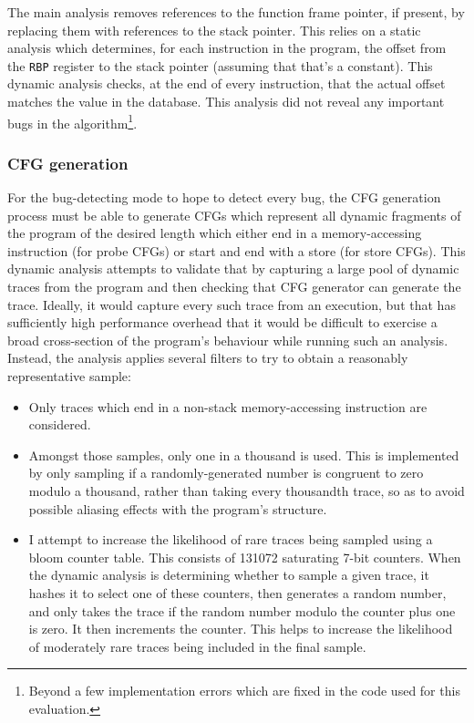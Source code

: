 The main analysis removes references to the function frame pointer, if
present, by replacing them with references to the stack pointer.  This
relies on a static analysis which determines, for each instruction in
the program, the offset from the \verb|RBP| register to the stack
pointer (assuming that that's a constant).  This dynamic analysis
checks, at the end of every instruction, that the actual offset
matches the value in the database.  This analysis did not reveal any
important bugs in the algorithm\footnote{Beyond a few implementation
  errors which are fixed in the code used for this evaluation.}.

\subsubsection{CFG generation}

For the bug-detecting mode to hope to detect every bug, the CFG
generation process must be able to generate CFGs which represent all
dynamic fragments of the program of the desired length which either
end in a memory-accessing instruction (for probe CFGs) or start and
end with a store (for store CFGs).  This dynamic analysis attempts to
validate that by capturing a large pool of dynamic traces from the
program and then checking that CFG generator can generate the trace.
Ideally, it would capture every such trace from an execution, but that
has sufficiently high performance overhead that it would be difficult
to exercise a broad cross-section of the program's behaviour while
running such an analysis.  Instead, the analysis applies several
filters to try to obtain a reasonably representative sample:

\begin{itemize}
\item
  Only traces which end in a non-stack memory-accessing instruction
  are considered.
\item
  Amongst those samples, only one in a thousand is used.  This is
  implemented by only sampling if a randomly-generated number is
  congruent to zero modulo a thousand, rather than taking every
  thousandth trace, so as to avoid possible aliasing effects with the
  program's structure.
\item
  I attempt to increase the likelihood of rare traces being sampled
  using a bloom counter table.  This consists of 131072 saturating
  7-bit counters.  When the dynamic analysis is determining whether to
  sample a given trace, it hashes it to select one of these counters,
  then generates a random number, and only takes the trace if the
  random number modulo the counter plus one is zero.  It then
  increments the counter.  This helps to increase the likelihood of
  moderately rare traces being included in the final sample.
\end{itemize}

